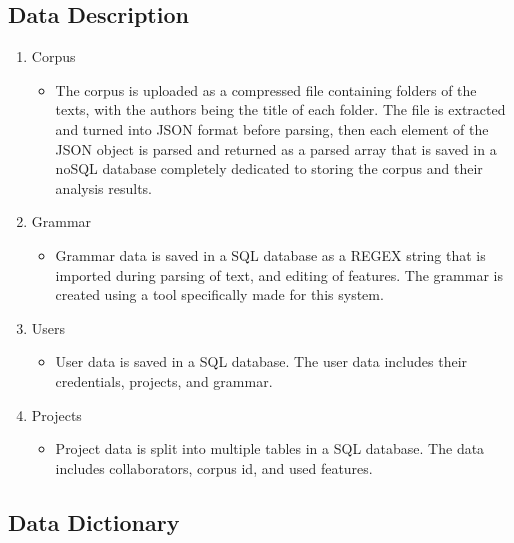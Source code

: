 \subsection{Data Description}
\begin{enumerate}
    \item Corpus \begin{itemize}
              \item The corpus is uploaded as a compressed file containing folders of the texts, with the authors being the title of each folder. The file is extracted and turned into JSON format before parsing, then each element of the JSON object is parsed and returned as a parsed array that is saved in a noSQL database completely dedicated to storing the corpus and their analysis results.
          \end{itemize}
    \item Grammar \begin{itemize}
              \item Grammar data is saved in a SQL database as a REGEX string that is imported during parsing of text, and editing of features. The grammar is created using a tool specifically made for this system.
          \end{itemize}
    \item Users \begin{itemize}
              \item User data is saved in a SQL database. The user data includes their credentials, projects, and grammar.
          \end{itemize}
    \item Projects \begin{itemize}
              \item Project data is split into multiple tables in a SQL database. The data includes collaborators, corpus id, and used features.
          \end{itemize}
\end{enumerate}

\subsection {Data Dictionary}

\begin{sortedlist}
\end{sortedlist}

